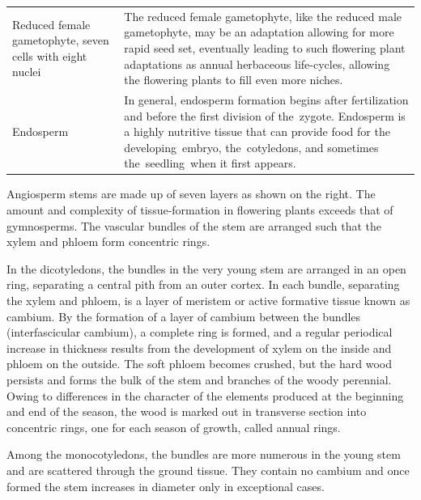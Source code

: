 \begin{table}
\begin{tabular}[t]{>{\raggedright\arraybackslash}p{20em}>{\raggedright\arraybackslash}p{45em}}
\rowcolor{gray!6}  Reduced female gametophyte, seven cells with eight nuclei & The reduced female gametophyte, like the reduced male gametophyte, may be an adaptation allowing for more rapid seed set, eventually leading to such flowering plant adaptations as annual herbaceous life-cycles, allowing the flowering plants to fill even more niches.\\
\addlinespace
Endosperm & In general, endosperm formation begins after fertilization and before the first division of the zygote. Endosperm is a highly nutritive tissue that can provide food for the developing embryo, the cotyledons, and sometimes the seedling when it first appears.\\
\bottomrule
\end{tabular}
\end{table}

\twocolumn

Angiosperm stems are made up of seven layers as shown on the right. The amount and complexity of tissue-formation in flowering plants exceeds that of gymnosperms. The vascular bundles of the stem are arranged such that the xylem and phloem form concentric rings.

In the dicotyledons, the bundles in the very young stem are arranged in an open ring, separating a central pith from an outer cortex. In each bundle, separating the xylem and phloem, is a layer of meristem or active formative tissue known as cambium. By the formation of a layer of cambium between the bundles (interfascicular cambium), a complete ring is formed, and a regular periodical increase in thickness results from the development of xylem on the inside and phloem on the outside. The soft phloem becomes crushed, but the hard wood persists and forms the bulk of the stem and branches of the woody perennial. Owing to differences in the character of the elements produced at the beginning and end of the season, the wood is marked out in transverse section into concentric rings, one for each season of growth, called annual rings.

Among the monocotyledons, the bundles are more numerous in the young stem and are scattered through the ground tissue. They contain no cambium and once formed the stem increases in diameter only in exceptional cases.



